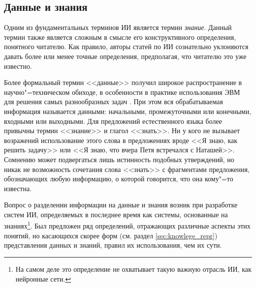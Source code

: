 \documentclass[a4paper,14pt, openany, twoside, final]{extbook} %
\begin{document}
\subsection{Данные и знания}

Одним из фундаментальных терминов ИИ является термин {\em знание}. Данный термин также является сложным в смысле его конструктивного определения, понятного читателю. Как правило, авторы статей по ИИ сознательно уклоняются давать более или менее точные определения, предполагая, что читателю это уже известно.

Более формальный термин <<данные>> получил широкое распространение в научно"=техническом обиходе, в особенности в практике использования ЭВМ для решения самых разнообразных задач \cite{AIDictionary}. При этом вся обрабатываемая информация называется данными: начальными, промежуточными или конечными, входными или выходными. Для предложений естественного языка более привычны термин <<знание>> и глагол <<знать>>. Ни у кого не вызывает возражений использование этого слова в предложениях вроде <<Я знаю, как решить задачу>> или <<Я знаю, что вчера Петя встречался с Наташей>>. Сомнению может подвергаться лишь истинность подобных утверждений, но никак не возможность сочетания слова <<знать>> с фрагментами предложения, обозначающих любую информацию, о которой говорится, что она кому"=то известна.

Вопрос о разделении информации на данные и знания возник при разработке систем ИИ, определяемых в последнее время как системы, основанные на знаниях\footnote{На самом деле это определение не охватывает такую важную отрасль ИИ, как нейронные сети.}. Был предложен ряд определений, отражающих различные аспекты этих понятий, но касающихся скорее форм (см. раздел \ref{sec:knowlege_repr}) представления данных и знаний, правил их использования, чем их сути.
\end{document}
